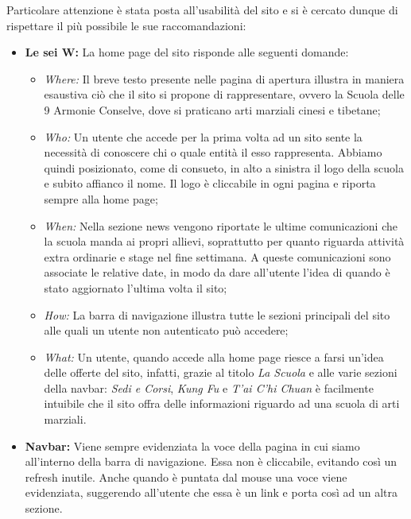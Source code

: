Particolare attenzione è stata posta all'usabilità del sito e si è cercato dunque di rispettare il più possibile le sue raccomandazioni:
\begin{itemize}
\item \textbf{Le sei W:} La home page del sito risponde alle seguenti domande: 

\begin{itemize}

\item \textit{Where:}
Il breve testo presente nelle pagina di apertura illustra in maniera esaustiva ciò che il sito si propone di rappresentare, ovvero la Scuola delle 9 Armonie Conselve, dove si praticano arti marziali cinesi e tibetane;

\item \textit{Who:}
Un utente che accede per la prima volta ad un sito sente la necessità di conoscere chi o quale entità il esso rappresenta. Abbiamo 	quindi posizionato, come di consueto, in alto a sinistra il logo della scuola e subito affianco il nome. Il logo è cliccabile in ogni pagina e riporta sempre alla home page; 

\item \textit{When:}
Nella sezione news vengono riportate le ultime comunicazioni che la scuola manda ai propri allievi, soprattutto per quanto riguarda attività extra ordinarie e stage nel fine settimana. A queste comunicazioni sono associate le relative date, in modo da dare all'utente l'idea di quando è stato aggiornato l'ultima volta il sito;

\item \textit{How:}
La barra di navigazione illustra tutte le sezioni principali del sito alle quali un utente non autenticato può accedere;

\item \textit{What:}
Un utente, quando accede alla home page riesce a farsi un'idea delle offerte del sito, infatti, grazie al titolo \textit{La Scuola} e alle varie sezioni della navbar: \textit{Sedi e Corsi}, \textit{Kung Fu} e \textit{T'ai C'hi Chuan} è facilmente intuibile che il sito offra delle informazioni riguardo ad una scuola di arti marziali.

\end{itemize}

\item \textbf{Navbar:} Viene sempre evidenziata la voce della pagina in cui siamo all'interno della barra di navigazione. Essa non è cliccabile, evitando così un refresh inutile. Anche quando è puntata dal mouse una voce viene evidenziata, suggerendo all'utente che essa è un link e porta così ad un altra sezione.


\end{itemize}
